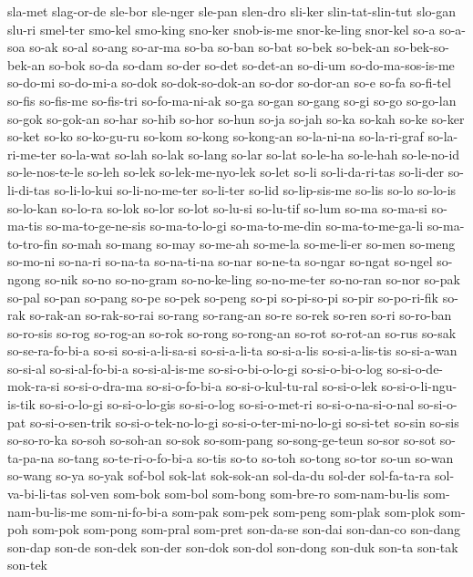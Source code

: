 {sla-met slag-or-de sle-bor sle-nger sle-pan slen-dro sli-ker
slin-tat-slin-tut slo-gan slu-ri smel-ter smo-kel smo-king sno-ker
snob-is-me snor-ke-ling snor-kel so-a so-a-soa so-ak so-al so-ang so-ar-ma
so-ba so-ban so-bat so-bek so-bek-an so-bek-so-bek-an so-bok so-da so-dam
so-der so-det so-det-an so-di-um so-do-ma-sos-is-me so-do-mi so-do-mi-a
so-dok so-dok-so-dok-an so-dor so-dor-an so-e so-fa so-fi-tel so-fis
so-fis-me so-fis-tri so-fo-ma-ni-ak so-ga so-gan so-gang so-gi so-go
so-go-lan so-gok so-gok-an so-har so-hib so-hor so-hun so-ja so-jah so-ka
so-kah so-ke so-ker so-ket so-ko so-ko-gu-ru so-kom so-kong so-kong-an
so-la-ni-na so-la-ri-graf so-la-ri-me-ter so-la-wat so-lah so-lak so-lang
so-lar so-lat so-le-ha so-le-hah so-le-no-id so-le-nos-te-le so-leh so-lek
so-lek-me-nyo-lek so-let so-li so-li-da-ri-tas so-li-der so-li-di-tas
so-li-lo-kui so-li-no-me-ter so-li-ter so-lid so-lip-sis-me so-lis so-lo
so-lo-is so-lo-kan so-lo-ra so-lok so-lor so-lot so-lu-si so-lu-tif so-lum
so-ma so-ma-si so-ma-tis so-ma-to-ge-ne-sis so-ma-to-lo-gi so-ma-to-me-din
so-ma-to-me-ga-li so-ma-to-tro-fin so-mah so-mang so-may so-me-ah so-me-la
so-me-li-er so-men so-meng so-mo-ni so-na-ri so-na-ta so-na-ti-na so-nar
so-ne-ta so-ngar so-ngat so-ngel so-ngong so-nik so-no so-no-gram
so-no-ke-ling so-no-me-ter so-no-ran so-nor so-pak so-pal so-pan so-pang
so-pe so-pek so-peng so-pi so-pi-so-pi so-pir so-po-ri-fik so-rak
so-rak-an so-rak-so-rai so-rang so-rang-an so-re so-rek so-ren so-ri
so-ro-ban so-ro-sis so-rog so-rog-an so-rok so-rong so-rong-an so-rot
so-rot-an so-rus so-sak so-se-ra-fo-bi-a so-si so-si-a-li-sa-si
so-si-a-li-ta so-si-a-lis so-si-a-lis-tis so-si-a-wan so-si-al
so-si-al-fo-bi-a so-si-al-is-me so-si-o-bi-o-lo-gi so-si-o-bi-o-log
so-si-o-de-mok-ra-si so-si-o-dra-ma so-si-o-fo-bi-a so-si-o-kul-tu-ral
so-si-o-lek so-si-o-li-ngu-is-tik so-si-o-lo-gi so-si-o-lo-gis so-si-o-log
so-si-o-met-ri so-si-o-na-si-o-nal so-si-o-pat so-si-o-sen-trik
so-si-o-tek-no-lo-gi so-si-o-ter-mi-no-lo-gi so-si-tet so-sin so-sis
so-so-ro-ka so-soh so-soh-an so-sok so-som-pang so-song-ge-teun so-sor
so-sot so-ta-pa-na so-tang so-te-ri-o-fo-bi-a so-tis so-to so-toh so-tong
so-tor so-un so-wan so-wang so-ya so-yak sof-bol sok-lat sok-sok-an
sol-da-du sol-der sol-fa-ta-ra sol-va-bi-li-tas sol-ven som-bok som-bol
som-bong som-bre-ro som-nam-bu-lis som-nam-bu-lis-me som-ni-fo-bi-a
som-pak som-pek som-peng som-plak som-plok som-poh som-pok som-pong
som-pral som-pret son-da-se son-dai son-dan-co son-dang son-dap son-de
son-dek son-der son-dok son-dol son-dong son-duk son-ta son-tak son-tek
}
